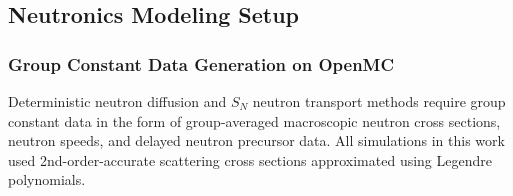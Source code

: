 \subsection{Neutronics Modeling Setup}

\subsubsection{Group Constant Data Generation on OpenMC} \label{sec:msre-gc}

Deterministic neutron diffusion and $S_N$ neutron transport methods require group constant data in
the form of group-averaged macroscopic neutron cross sections, neutron speeds, and delayed neutron
precursor data.
All simulations in this work used 2nd-order-accurate scattering cross sections approximated using
Legendre polynomials.
%
